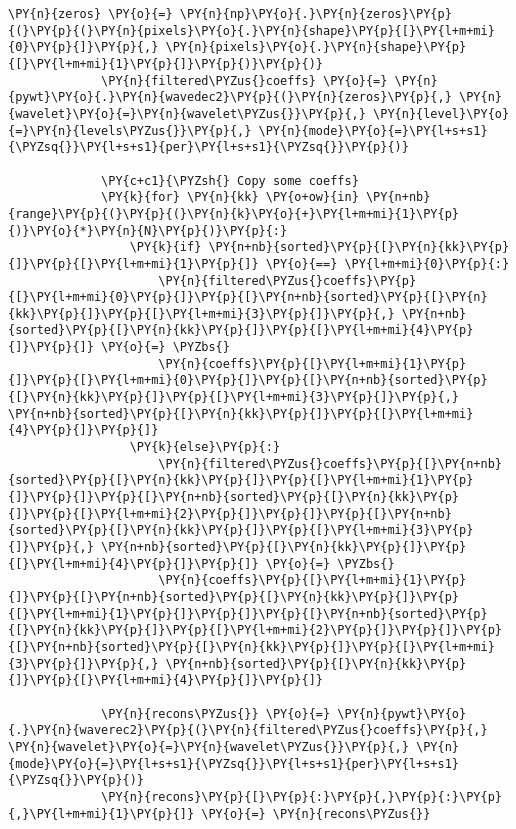 \begin{Verbatim}[commandchars=\\\{\}]
             \PY{n}{zeros} \PY{o}{=} \PY{n}{np}\PY{o}{.}\PY{n}{zeros}\PY{p}{(}\PY{p}{(}\PY{n}{pixels}\PY{o}{.}\PY{n}{shape}\PY{p}{[}\PY{l+m+mi}{0}\PY{p}{]}\PY{p}{,} \PY{n}{pixels}\PY{o}{.}\PY{n}{shape}\PY{p}{[}\PY{l+m+mi}{1}\PY{p}{]}\PY{p}{)}\PY{p}{)}
             \PY{n}{filtered\PYZus{}coeffs} \PY{o}{=} \PY{n}{pywt}\PY{o}{.}\PY{n}{wavedec2}\PY{p}{(}\PY{n}{zeros}\PY{p}{,} \PY{n}{wavelet}\PY{o}{=}\PY{n}{wavelet\PYZus{}}\PY{p}{,} \PY{n}{level}\PY{o}{=}\PY{n}{levels\PYZus{}}\PY{p}{,} \PY{n}{mode}\PY{o}{=}\PY{l+s+s1}{\PYZsq{}}\PY{l+s+s1}{per}\PY{l+s+s1}{\PYZsq{}}\PY{p}{)}
         
             \PY{c+c1}{\PYZsh{} Copy some coeffs}
             \PY{k}{for} \PY{n}{kk} \PY{o+ow}{in} \PY{n+nb}{range}\PY{p}{(}\PY{p}{(}\PY{n}{k}\PY{o}{+}\PY{l+m+mi}{1}\PY{p}{)}\PY{o}{*}\PY{n}{N}\PY{p}{)}\PY{p}{:}
                 \PY{k}{if} \PY{n+nb}{sorted}\PY{p}{[}\PY{n}{kk}\PY{p}{]}\PY{p}{[}\PY{l+m+mi}{1}\PY{p}{]} \PY{o}{==} \PY{l+m+mi}{0}\PY{p}{:}
                     \PY{n}{filtered\PYZus{}coeffs}\PY{p}{[}\PY{l+m+mi}{0}\PY{p}{]}\PY{p}{[}\PY{n+nb}{sorted}\PY{p}{[}\PY{n}{kk}\PY{p}{]}\PY{p}{[}\PY{l+m+mi}{3}\PY{p}{]}\PY{p}{,} \PY{n+nb}{sorted}\PY{p}{[}\PY{n}{kk}\PY{p}{]}\PY{p}{[}\PY{l+m+mi}{4}\PY{p}{]}\PY{p}{]} \PY{o}{=} \PYZbs{}
                     \PY{n}{coeffs}\PY{p}{[}\PY{l+m+mi}{1}\PY{p}{]}\PY{p}{[}\PY{l+m+mi}{0}\PY{p}{]}\PY{p}{[}\PY{n+nb}{sorted}\PY{p}{[}\PY{n}{kk}\PY{p}{]}\PY{p}{[}\PY{l+m+mi}{3}\PY{p}{]}\PY{p}{,} \PY{n+nb}{sorted}\PY{p}{[}\PY{n}{kk}\PY{p}{]}\PY{p}{[}\PY{l+m+mi}{4}\PY{p}{]}\PY{p}{]}
                 \PY{k}{else}\PY{p}{:}
                     \PY{n}{filtered\PYZus{}coeffs}\PY{p}{[}\PY{n+nb}{sorted}\PY{p}{[}\PY{n}{kk}\PY{p}{]}\PY{p}{[}\PY{l+m+mi}{1}\PY{p}{]}\PY{p}{]}\PY{p}{[}\PY{n+nb}{sorted}\PY{p}{[}\PY{n}{kk}\PY{p}{]}\PY{p}{[}\PY{l+m+mi}{2}\PY{p}{]}\PY{p}{]}\PY{p}{[}\PY{n+nb}{sorted}\PY{p}{[}\PY{n}{kk}\PY{p}{]}\PY{p}{[}\PY{l+m+mi}{3}\PY{p}{]}\PY{p}{,} \PY{n+nb}{sorted}\PY{p}{[}\PY{n}{kk}\PY{p}{]}\PY{p}{[}\PY{l+m+mi}{4}\PY{p}{]}\PY{p}{]} \PY{o}{=} \PYZbs{}
                     \PY{n}{coeffs}\PY{p}{[}\PY{l+m+mi}{1}\PY{p}{]}\PY{p}{[}\PY{n+nb}{sorted}\PY{p}{[}\PY{n}{kk}\PY{p}{]}\PY{p}{[}\PY{l+m+mi}{1}\PY{p}{]}\PY{p}{]}\PY{p}{[}\PY{n+nb}{sorted}\PY{p}{[}\PY{n}{kk}\PY{p}{]}\PY{p}{[}\PY{l+m+mi}{2}\PY{p}{]}\PY{p}{]}\PY{p}{[}\PY{n+nb}{sorted}\PY{p}{[}\PY{n}{kk}\PY{p}{]}\PY{p}{[}\PY{l+m+mi}{3}\PY{p}{]}\PY{p}{,} \PY{n+nb}{sorted}\PY{p}{[}\PY{n}{kk}\PY{p}{]}\PY{p}{[}\PY{l+m+mi}{4}\PY{p}{]}\PY{p}{]}
                 
             \PY{n}{recons\PYZus{}} \PY{o}{=} \PY{n}{pywt}\PY{o}{.}\PY{n}{waverec2}\PY{p}{(}\PY{n}{filtered\PYZus{}coeffs}\PY{p}{,} \PY{n}{wavelet}\PY{o}{=}\PY{n}{wavelet\PYZus{}}\PY{p}{,} \PY{n}{mode}\PY{o}{=}\PY{l+s+s1}{\PYZsq{}}\PY{l+s+s1}{per}\PY{l+s+s1}{\PYZsq{}}\PY{p}{)}
             \PY{n}{recons}\PY{p}{[}\PY{p}{:}\PY{p}{,}\PY{p}{:}\PY{p}{,}\PY{l+m+mi}{1}\PY{p}{]} \PY{o}{=} \PY{n}{recons\PYZus{}}
             

\end{Verbatim}
